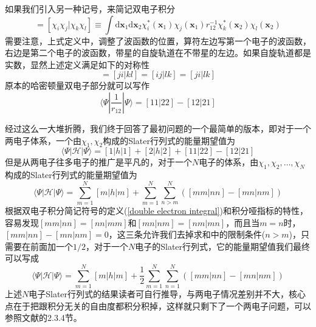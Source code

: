 \documentclass[12pt,a4paper,openany,twoside]{book}
\numberwithin{equation}{section}
\begin{document}
          如果我们引入另一种记号，来简记双电子积分
          \begin{equation}
            [i j | k l] =\left[\chi_{i} \chi_{j} | \chi_{k} \chi_{l}\right]\equiv\int \mathrm{d} \mathbf{x}_{1} \mathrm{d} \mathbf{x}_{2} \chi_{i}^{*}\left(\mathbf{x}_{1}\right) \chi_{j}\left(\mathbf{x}_{1}\right) r_{12}^{-1} \chi_{{k}}^{*}\left(\mathbf{x}_{2}\right) \chi_{l}\left(\mathbf{x}_{2}\right)
            \label{double electron integral}
          \end{equation}
          需要注意，上式定义中，调整了波函数的位置，算符左边写第一个电子的波函数，右边是第二个电子的波函数，带星的自旋轨道在不带星的左边。如果自旋轨道都是实数，显然上述定义满足如下的对称性
          \begin{equation}
            [i j | k l]=[j i | k l]=[i j | l k]=[j i | l k]
          \end{equation}
          原本的哈密顿量双电子部分就可以写作
          \begin{equation}
            \langle\Psi|\frac{1}{r_{12}}| \Psi \rangle = [11|22] - [12|21]
          \end{equation}
          
          经过这么一大堆折腾，我们终于回答了最初问题的一个最简单的版本，即对于一个两电子体系，一个由$\chi_1, \chi_2$构成的Slater行列式的能量期望值为
          \begin{equation}
            \langle \Psi|\mathscr{H}|\Psi\rangle = [1|h|1] + [2|h|2] + [11|22] - [12|21]
          \end{equation}
          但是从两电子往多电子的推广是平凡的，对于一个$N$电子的体系，由$\chi_1, \chi_2,\dots,\chi_N$构成的Slater行列式的能量期望值为
          \begin{equation}
            \langle \Psi|\mathscr{H}|\Psi\rangle =\sum_{m=1}^N [m|h|m] + \sum_{m=1}^N\sum_{n>m}^N \left([mm|nn] - [mn|nm]\right)
          \end{equation}
          根据双电子积分简记符号的定义(\ref{double electron integral})和积分哑指标的特性，容易发现$[mm|nn] = [nn|mm]$和$[mn|nm]=[nm|mn]$，而且当$m=n$时，$[mm|nn] - [mn|nm] = 0$，这三条允许我们去掉求和中的限制条件($n>m$)，只需要在前面加一个$1/2$，对于一个$N$电子的Slater行列式，它的能量期望值我们最终可以写成
          \begin{equation}
            \langle \Psi|\mathscr{H}|\Psi\rangle =\sum_{m=1}^N [m|h|m] + \frac{1}{2}\sum_{m=1}^N\sum_{n=1}^N \left([mm|nn] - [mn|nm]\right)
          \end{equation}
          上述$N$电子Slater行列式的结果读者可自行推导，与两电子情况差别并不大，核心点在于把跟积分无关的自由度都积分积掉，这样就只剩下了一个两电子问题，可以参照文献\cite{Szabo1989Modern}的2.3.4节。
\end{document}

